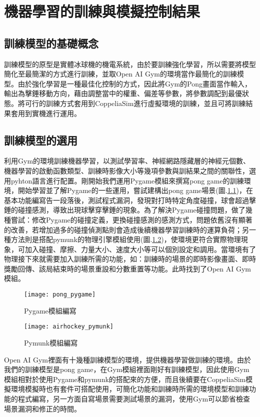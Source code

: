 \chapter{機器學習的訓練與模擬控制結果}
\section{訓練模型的基礎概念}
 訓練模型的原型是實體冰球機的機電系統，由於要訓練強化學習，所以需要將模型簡化至最簡潔的方式進行訓練，並取Open AI Gym的環境當作最簡化的訓練模型。由於強化學習是一種最佳化控制的方式，因此將Gym的Pong畫面當作輸入，輸出為擊錘移動方向，藉由調整當中的權重、偏差等參數，將參數調配到最優狀態。將可行的訓練方式套用到CoppeliaSim進行虛擬環境的訓練，並且可將訓練結果套用到實機進行運用。\\
\section{訓練模型的選用}
 利用Gym的環境訓練機器學習，以測試學習率、神經網路隱藏層的神經元個數、機器學習的啟動函數類型、訓練時影像大小等幾項參數與訓結果之間的關聯性，選用pyhton語言進行配置。剛開始我們運用Pygame模組來撰寫pong game的訓練環境，開始學習並了解Pygame的一些運用，嘗試建構出pong game場景(圖.\ref{fig.pong_pygame})，在基本功能編寫告一段落後，測試程式漏洞，發現對打時特定角度碰撞，球會超過擊錘的碰撞感測，導致出現球擊穿擊錘的現象。為了解決Pygame碰撞問題，做了幾種嘗試：修改Pygame的碰撞定義，更換碰撞感測的感測方式，問題依舊沒有顯著的改善，若增加過多的碰撞偵測點則會造成後續機器學習訓練時的運算負荷；另一種方法則是搭配pymunk的物理引擎模組使用(圖.\ref{fig.airhockey_pymunk})，使環境更符合實際物理現象，可加入碰撞、摩擦、力量大小、速度大小等可以個別設定和調用。當環境有了物理接下來就需要加入訓練所需的功能，如：訓練時的場景的即時影像畫面、即時獎勵回傳、該局結束時的場景重設和分數重置等功能。此時找到了Open AI Gym模組。\\
\begin{figure}[hbt!]
\begin{center}
\texttt{[image: pong\_pygame]}
\caption{\Large Pygame模組編寫}
\label{fig.pong_pygame}
\end{center}
\end{figure}

\begin{figure}[hbt!]
\begin{center}
\texttt{[image: airhockey\_pymunk]}
\caption{\Large Pymunk模組編寫}
\label{fig.airhockey_pymunk}
\end{center}
\end{figure}
 \newpage %
 Open AI Gym裡面有十幾種訓練模型的環境，提供機器學習做訓練的環境。由於我們的訓練模型是pong game，在Gym模組裡面剛好有訓練模型，因此使用Gym模組相對於使用Pygame和pymunk的搭配來的方便，而且後續要在CoppeliaSim模擬環境模擬時也有套件可搭配使用，可簡化功能和訓練時所需的環境模型和訓練功能的程式編寫，另一方面自寫場景需要測試場景的漏洞，使用Gym可以節省檢查場景漏洞和修正的時間。\\
